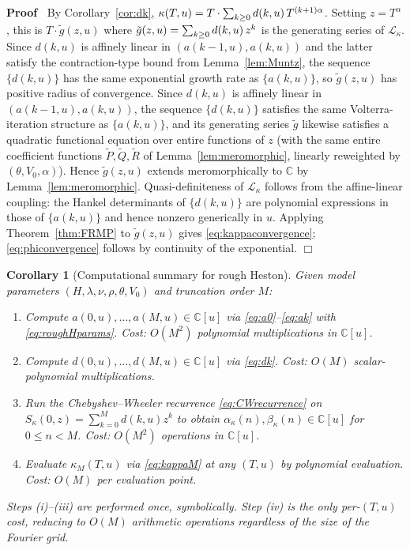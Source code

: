\documentclass{article}
\newcommand{\tmem}[1]{{\em #1\/}}
\newenvironment{proof}{\noindent\textbf{Proof\ }}{\hspace*{\fill}$\Box$\medskip}
\newtheorem{corollary}{Corollary}
\newcommand{\C}{\mathbb{C}}
\newcommand{\Lkap}{\mathcal{L}_{\kappa}}
\begin{document}
\begin{proof}
  By  Corollary~\ref{cor:dk}, $\kappa (T, u) = T \cdot \sum_{k \ge 0} d (k, u)
  \hspace{0.17em} T^{(k + 1) \alpha}$. Setting $z = T^{\alpha}$, this is $T
  \cdot \tilde{g} (z, u)$ where $\tilde{g} (z, u) = \sum_{k \ge 0} d (k, u) 
  \hspace{0.17em} z^k$ is the generating series of $\Lkap$. Since $d (k, u)$
  is affinely linear in $(a (k - 1, u), a (k, u))$ and the latter satisfy the
  contraction-type bound from  Lemma~\ref{lem:Muntz}, the sequence $\{d (k,
  u)\}$ has the same exponential growth rate as $\{a (k, u)\}$, so $\tilde{g}
  (z, u)$ has positive radius of convergence. Since $d (k, u)$ is affinely
  linear in $(a (k - 1, u), a (k, u))$, the sequence $\{d (k, u)\}$ satisfies
  the same Volterra-iteration structure as $\{a (k, u)\}$, and its generating
  series $\tilde{g}$ likewise satisfies a quadratic functional equation over
  entire functions of $z$ (with the same entire coefficient functions
  $\tilde{P}, \tilde{Q}, \tilde{R}$ of  Lemma~\ref{lem:meromorphic}, linearly
  reweighted by $(\theta, V_0, \alpha)$). Hence $\tilde{g} (z, u)$ extends
  meromorphically to $\C$ by  Lemma~\ref{lem:meromorphic}. Quasi-definiteness
  of $\Lkap$ follows from the affine-linear coupling: the Hankel determinants
  of $\{d (k, u)\}$ are polynomial expressions in those of $\{a (k, u)\}$ and
  hence nonzero generically in $u$. Applying  Theorem~\ref{thm:FRMP} to
  $\tilde{g} (z, u)$ gives \eqref{eq:kappaconvergence};
  \eqref{eq:phiconvergence} follows by continuity of the exponential.
\end{proof}

\begin{corollary}
  [Computational summary for rough Heston]\label{cor:algorithm}Given model
  parameters $(H, \lambda, \nu, \rho, \theta, V_0)$ and truncation order $M$:
  \begin{enumerate}
    \item Compute $a (0, u), \ldots, a (M, u) \in \C [u]$ via
    \eqref{eq:a0}--\eqref{eq:ak} with \eqref{eq:roughHparams}. Cost: $O (M^2)$
    polynomial multiplications in $\C [u]$.
    
    \item Compute $d (0, u), \ldots, d (M, u) \in \C [u]$ via \eqref{eq:dk}.
    Cost: $O (M)$ scalar-polynomial multiplications.
    
    \item Run the Chebyshev--Wheeler recurrence \eqref{eq:CWrecurrence} on
    $S_{\kappa} (0, z) = \sum_{k = 0}^M d (k, u) z^k$ to obtain
    $\alpha_{\kappa} (n), \beta_{\kappa} (n) \in \C [u]$ for $0 \le n < M$.
    Cost: $O (M^2)$ operations in $\C [u]$.
    
    \item Evaluate $\kappa_M (T, u)$ via \eqref{eq:kappaM} at any $(T, u)$ by
    polynomial evaluation. Cost: $O (M)$ per evaluation point.
  \end{enumerate}
  Steps (i)--(iii) are performed {\tmem{once}}, symbolically. Step (iv) is the
  only per-$(T, u)$ cost, reducing to $O (M)$ arithmetic operations regardless
  of the size of the Fourier grid.
\end{corollary}
\end{document}
